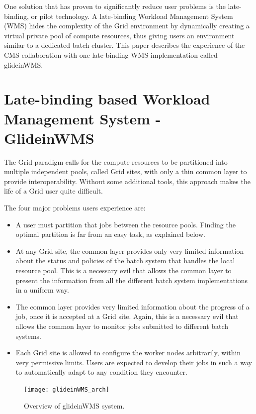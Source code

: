 \documentclass[a4paper]{jpconf}
\begin{document}
One solution that has proven to significantly reduce user problems is the late-binding, or pilot technology.  
A late-binding Workload Management System (WMS) hides the complexity of the Grid environment by dynamically creating 
a virtual private pool of compute resources, thus giving users an environment similar to a dedicated batch cluster.
This paper describes the experience of the CMS collaboration with one late-binding WMS implementation called glideinWMS. 
\section{Late-binding based Workload Management System - GlideinWMS }
The Grid paradigm calls for the compute resources to be partitioned into multiple independent pools, called Grid sites,
with only a thin common layer to provide interoperability.
Without some additional tools, this approach makes the life of a Grid user quite difficult. 

The four major problems users experience are:
\begin {itemize}
\item 
A user must partition that jobs between the resource pools.
Finding the optimal partition is far from an easy task, as explained below.
\item
At any Grid site, the common layer provides only very limited information about the status and policies of the
batch system that handles the local resource pool.
This is a necessary evil that allows the common layer to present the information from all the different batch system 
implementations in a uniform way. 
\item 
The common layer provides very limited information about the progress of a job, once it is accepted at a Grid site.
Again, this is a necessary evil that allows the common layer to monitor jobs submitted to different batch systems.  
\item
Each Grid site is allowed to configure the worker nodes arbitrarily, within very permissive limits.
Users are expected to develop their jobs in such a way to automatically adapt to any condition they encounter.
\end{itemize}
\begin{figure}
\begin{center}
\texttt{[image: glideinWMS\_arch]}
\end{center}
\caption{Overview of glideinWMS system.}
\label{fig:glideinWMS}
\end{figure}
\end{document}
